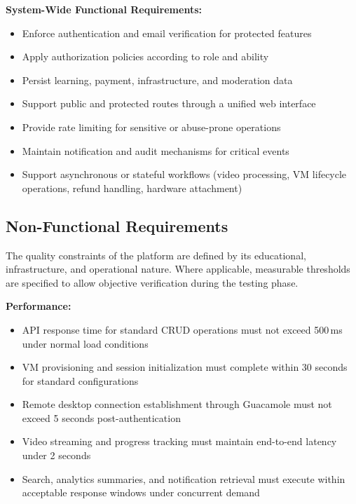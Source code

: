 \textbf{System-Wide Functional Requirements:}
\begin{itemize}[label=-]
    \item Enforce authentication and email verification for protected features
    \item Apply authorization policies according to role and ability
    \item Persist learning, payment, infrastructure, and moderation data
    \item Support public and protected routes through a unified web interface
    \item Provide rate limiting for sensitive or abuse-prone operations
    \item Maintain notification and audit mechanisms for critical events
    \item Support asynchronous or stateful workflows (video processing, VM lifecycle
          operations, refund handling, hardware attachment)
\end{itemize}

\subsection{Non-Functional Requirements}

The quality constraints of the platform are defined by its educational,
infrastructure, and operational nature. Where applicable, measurable thresholds are
specified to allow objective verification during the testing phase.

\textbf{Performance:}
\begin{itemize}[label=-]
    \item API response time for standard CRUD operations must not exceed 500\,ms under
          normal load conditions
    \item VM provisioning and session initialization must complete within 30 seconds
          for standard configurations
    \item Remote desktop connection establishment through Guacamole must not exceed
          5 seconds post-authentication
    \item Video streaming and progress tracking must maintain end-to-end latency under
          2 seconds
    \item Search, analytics summaries, and notification retrieval must execute within
          acceptable response windows under concurrent demand
\end{itemize}

